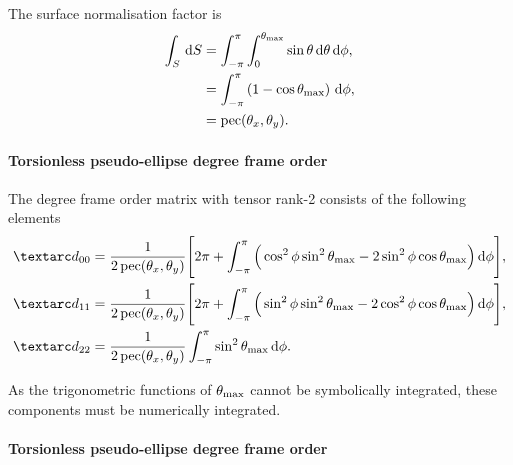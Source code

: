 The surface normalisation factor is
\begin{subequations}
\begin{align}
    \int_S \,\mathrm{d} S &= \int_{-\pi}^{\pi} \int_{0}^{\theta_\textrm{max}} \sin\theta \,\mathrm{d}\theta \,\mathrm{d}\phi , \\
                   &= \int_{-\pi}^{\pi} \left( 1 - \cos\theta_\textrm{max} \right) \,\mathrm{d}\phi , \\
                   &= \operatorname{pec}(\theta_x, \theta_y) .
\end{align}
\end{subequations}


\paragraph{Torsionless pseudo-ellipse  degree frame order}

The  degree frame order matrix with tensor rank-2 consists of the following elements
\begin{subequations} \label{eq: pseudo-ellipse, torsionless 1st degree frame order matrix}
\begin{align}
    \FO_{00} &= \frac{1}{2\pec(\conethetax, \conethetay)} \Bigg[
                    2\pi +
                    \int_{-\pi}^{\pi}
                        \Big( \cos^2\phi \sin^2\conethetamax - 2\sin^2\phi \cos\conethetamax \Big)
                    \diff\phi
                \Bigg] , \\
    \FO_{11} &= \frac{1}{2\pec(\conethetax, \conethetay)} \Bigg[
                    2\pi +
                    \int_{-\pi}^{\pi}
                        \Big( \sin^2\phi \sin^2\conethetamax - 2\cos^2\phi \cos\conethetamax \Big)
                    \diff\phi
                \Bigg] , \\
    \FO_{22} &= \frac{1}{2\pec(\conethetax, \conethetay)}
                    \int_{-\pi}^{\pi}
                        \sin^2\conethetamax
                    \diff\phi .
\end{align}
\end{subequations}

As the trigonometric functions of $\theta_\textrm{max}$ cannot be symbolically integrated, these components must be numerically integrated.


\paragraph{Torsionless pseudo-ellipse  degree frame order}

